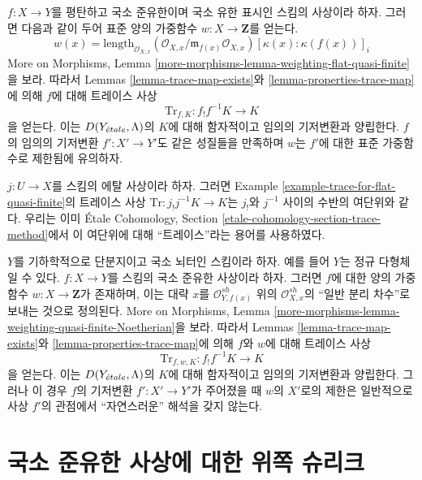 \begin{example}
\label{example-trace-for-flat-quasi-finite}
$f : X \to Y$를 평탄하고 국소 준유한이며 국소 유한 표시인 스킴의
사상이라 하자. 그러면 다음과 같이 두어 표준 양의 가중함수
$w : X \to \mathbf{Z}$를 얻는다.
$$
w(x) = \text{length}_{\mathcal{O}_{X, x}}
(\mathcal{O}_{X, x}/\mathfrak m_{f(x)} \mathcal{O}_{X, x})
[\kappa(x) : \kappa(f(x))]_i
$$
More on Morphisms, Lemma
\ref{more-morphisms-lemma-weighting-flat-quasi-finite}을 보라.
따라서 Lemmas \ref{lemma-trace-map-exists}와
\ref{lemma-properties-trace-map}에 의해 $f$에 대해 트레이스 사상
$$
\text{Tr}_{f, K} : f_!f^{-1}K \longrightarrow K
$$
을 얻는다. 이는 $D(Y_{\acute{e}tale}, \Lambda)$의 $K$에 대해 함자적이고
임의의 기저변환과 양립한다. $f$의 임의의 기저변환
$f' : X' \to Y'$도 같은 성질들을 만족하며 $w$는 $f'$에 대한
표준 가중함수로 제한됨에 유의하자.
\end{example}

\begin{remark}
\label{remark-trace-etale-counit}
$j : U \to X$를 스킴의 에탈 사상이라 하자. 그러면 Example
\ref{example-trace-for-flat-quasi-finite}의 트레이스 사상
$\text{Tr} : j_!j^{-1}K \to K$는 $j_!$와 $j^{-1}$ 사이의 수반의
여단위와 같다. 우리는 이미 \'Etale Cohomology, Section
\ref{etale-cohomology-section-trace-method}에서 이 여단위에 대해
``트레이스''라는 용어를 사용하였다.
\end{remark}

\begin{example}
\label{example-trace-for-quasi-finite-over-normal}
$Y$를 기하학적으로 단분지이고 국소 뇌터인 스킴이라 하자. 예를 들어
$Y$는 정규 다형체일 수 있다. $f : X \to Y$를 스킴의 국소 준유한
사상이라 하자. 그러면 $f$에 대한 양의 가중함수
$w : X \to \mathbf{Z}$가 존재하며, 이는 대략 $x$를
$\mathcal{O}_{Y, f(x)}^{sh}$ 위의 $\mathcal{O}_{X, x}^{sh}$의
``일반 분리 차수''로 보내는 것으로 정의된다. More on Morphisms, Lemma
\ref{more-morphisms-lemma-weighting-quasi-finite-Noetherian}을 보라.
따라서 Lemmas \ref{lemma-trace-map-exists}와
\ref{lemma-properties-trace-map}에 의해 $f$와 $w$에 대해 트레이스 사상
$$
\text{Tr}_{f, w, K} : f_!f^{-1}K \longrightarrow K
$$
을 얻는다. 이는 $D(Y_{\acute{e}tale}, \Lambda)$의 $K$에 대해 함자적이고
임의의 기저변환과 양립한다. 그러나 이 경우 $f$의 기저변환
$f' : X' \to Y'$가 주어졌을 때 $w$의 $X'$로의 제한은 일반적으로
사상 $f'$의 관점에서 ``자연스러운'' 해석을 갖지 않는다.
\end{example}

\section{국소 준유한 사상에 대한 위쪽 슈리크}
\label{section-duality-locally-quasi-finite}

